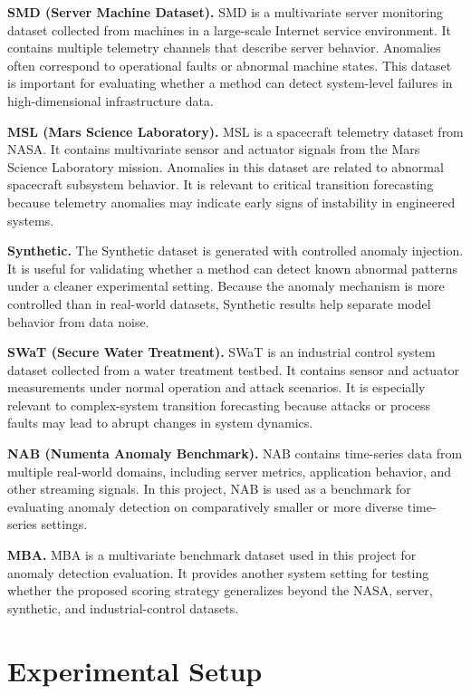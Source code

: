 \documentclass[a4paper,11pt]{article}
\begin{document}
\textbf{SMD (Server Machine Dataset).}
SMD is a multivariate server monitoring dataset collected from machines in a large-scale Internet service environment. It contains multiple telemetry channels that describe server behavior. Anomalies often correspond to operational faults or abnormal machine states. This dataset is important for evaluating whether a method can detect system-level failures in high-dimensional infrastructure data.

\textbf{MSL (Mars Science Laboratory).}
MSL is a spacecraft telemetry dataset from NASA. It contains multivariate sensor and actuator signals from the Mars Science Laboratory mission. Anomalies in this dataset are related to abnormal spacecraft subsystem behavior. It is relevant to critical transition forecasting because telemetry anomalies may indicate early signs of instability in engineered systems.

\textbf{Synthetic.}
The Synthetic dataset is generated with controlled anomaly injection. It is useful for validating whether a method can detect known abnormal patterns under a cleaner experimental setting. Because the anomaly mechanism is more controlled than in real-world datasets, Synthetic results help separate model behavior from data noise.

\textbf{SWaT (Secure Water Treatment).}
SWaT is an industrial control system dataset collected from a water treatment testbed. It contains sensor and actuator measurements under normal operation and attack scenarios. It is especially relevant to complex-system transition forecasting because attacks or process faults may lead to abrupt changes in system dynamics.

\textbf{NAB (Numenta Anomaly Benchmark).}
NAB contains time-series data from multiple real-world domains, including server metrics, application behavior, and other streaming signals. In this project, NAB is used as a benchmark for evaluating anomaly detection on comparatively smaller or more diverse time-series settings.

\textbf{MBA.}
MBA is a multivariate benchmark dataset used in this project for anomaly detection evaluation. It provides another system setting for testing whether the proposed scoring strategy generalizes beyond the NASA, server, synthetic, and industrial-control datasets.

\section{Experimental Setup}
\end{document}
